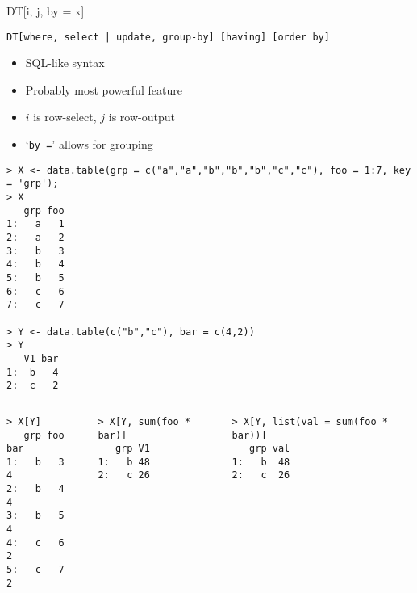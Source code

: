 \documentclass[12pt]{beamer}
\begin{document}
\begin{frame}{DT[i, j, by = x]}

\texttt{DT[where, select | update, group-by] [having] [order by]}


\begin{itemize}
\item<2-> SQL-like syntax
\item<3-> Probably most powerful feature
\item<4-> $i$ is row-select, $j$ is row-output
\item<5-> `\texttt{by =}' allows for grouping
\end{itemize}

\end{frame}


\begin{frame}[fragile]

\begin{verbatim}
> X <- data.table(grp = c("a","a","b","b","b","c","c"), foo = 1:7, key = 'grp');
> X
   grp foo
1:   a   1
2:   a   2
3:   b   3
4:   b   4
5:   b   5
6:   c   6
7:   c   7

> Y <- data.table(c("b","c"), bar = c(4,2))
> Y
   V1 bar
1:  b   4
2:  c   2
\end{verbatim}


\begin{columns}
\begin{column}[t]{3cm}
\begin{verbatim}
> X[Y]
   grp foo bar
1:   b   3   4
2:   b   4   4
3:   b   5   4
4:   c   6   2
5:   c   7   2
\end{verbatim}
\end{column}

\begin{column}[t]{3cm}
\begin{verbatim}
> X[Y, sum(foo * bar)]
   grp V1
1:   b 48
2:   c 26
\end{verbatim}
\end{column}

\begin{column}[t]{3cm}
\begin{verbatim}
> X[Y, list(val = sum(foo * bar))]
   grp val
1:   b  48
2:   c  26
\end{verbatim}
\end{column}
\end{columns}

\end{frame}
\end{document}
